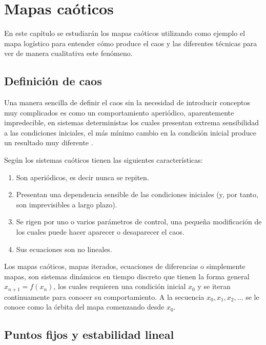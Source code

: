 \chapter{Mapas caóticos}
    
    En este capítulo se estudiarán los mapas caóticos utilizando como ejemplo el mapa logístico para entender cómo produce el caos y las diferentes técnicas para ver de manera cualitativa este fenómeno.

    \section{Definición de caos}
    
        Una manera sencilla de definir el caos sin la necesidad de introducir conceptos muy complicados es como un comportamiento aperiódico, aparentemente impredecible, en sistemas deterministas los cuales presentan extrema sensibilidad a las condiciones iniciales, el más mínimo cambio en la condición inicial produce un resultado muy diferente \cite{Strogatz1994}.

        Según \cite{Sprott2003} los sistemas caóticos tienen las siguientes características:

        \begin{enumerate}
            \item Son aperiódicos, es decir nunca se repiten.
            \item Presentan una dependencia sensible de las condiciones iniciales (y, por tanto, son imprevisibles a largo plazo).
            \item Se rigen por uno o varios parámetros de control, una pequeña modificación de los cuales puede hacer aparecer o desaparecer el caos.
            \item Sus ecuaciones son no lineales.
        \end{enumerate}

        Los mapas caóticos, mapas iterados, ecuaciones de diferencias o simplemente mapas, son sistemas dinámicos en tiempo discreto que tienen la forma general $x_{n+1} = f(x_{n})$, los cuales requieren una condición inicial $x_{0}$ y se iteran continuamente para conocer su comportamiento. A la secuencia $x_{0}, x_{1}, x_{2} , \ldots $ se le conoce como la órbita del mapa comenzando desde $x_{0}$.

    \section{Puntos fijos y estabilidad lineal}

